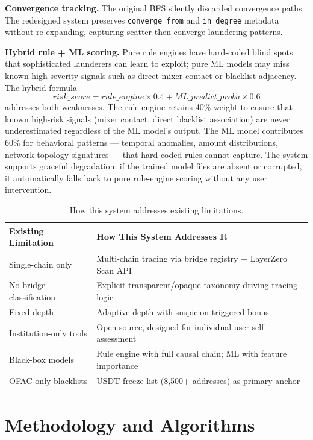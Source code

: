 \documentclass[12pt,a4paper]{article}
\begin{document}
\textbf{Convergence tracking.} The original BFS silently discarded convergence paths. The redesigned system preserves \texttt{converge\_from} and \texttt{in\_degree} metadata without re-expanding, capturing scatter-then-converge laundering patterns.

\textbf{Hybrid rule + ML scoring.} Pure rule engines have hard-coded blind spots that sophisticated launderers can learn to exploit; pure ML models may miss known high-severity signals such as direct mixer contact or blacklist adjacency. The hybrid formula
\[
\textit{risk\_score} = \textit{rule\_engine} \times 0.4 + \textit{ML\_predict\_proba} \times 0.6
\]
addresses both weaknesses. The rule engine retains 40\% weight to ensure that known high-risk signals (mixer contact, direct blacklist association) are never underestimated regardless of the ML model's output. The ML model contributes 60\% for behavioral patterns --- temporal anomalies, amount distributions, network topology signatures --- that hard-coded rules cannot capture. The system supports graceful degradation: if the trained model files are absent or corrupted, it automatically falls back to pure rule-engine scoring without any user intervention.

\begin{table}[htbp]
\centering
\caption{How this system addresses existing limitations.}
\label{tab:limitations}
\small
\begin{tabularx}{\textwidth}{l X}
\toprule
\textbf{Existing Limitation} & \textbf{How This System Addresses It} \\
\midrule
Single-chain only & Multi-chain tracing via bridge registry + LayerZero Scan API \\
No bridge classification & Explicit transparent/opaque taxonomy driving tracing logic \\
Fixed depth & Adaptive depth with suspicion-triggered bonus \\
Institution-only tools & Open-source, designed for individual user self-assessment \\
Black-box models & Rule engine with full causal chain; ML with feature importance \\
OFAC-only blacklists & USDT freeze list (8,500+ addresses) as primary anchor \\
\bottomrule
\end{tabularx}
\end{table}


\section{Methodology and Algorithms}
\end{document}
